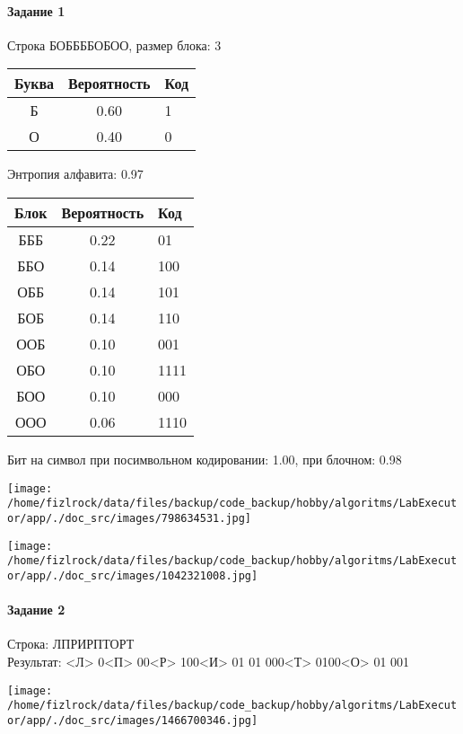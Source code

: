 \documentclass[a4paper, 12pt]{article}
\begin{document}
\paragraph{Задание 1}

Строка БОББББОБОО, размер блока: 3
\begin{center}
 \begin{tabular}{ |c|c|l| } 
  \hline
     Буква & Вероятность & Код\\ \hline
Б & 0.60 & 1\\\hline
О & 0.40 & 0
\\ \hline \end{tabular}
\end{center}
Энтропия алфавита: 0.97
\begin{center}
 \begin{tabular}{ |c|c|l| } 
  \hline
     Блок & Вероятность & Код\\ \hline
БББ & 0.22 & 01\\\hline
ББО & 0.14 & 100\\\hline
ОББ & 0.14 & 101\\\hline
БОБ & 0.14 & 110\\\hline
ООБ & 0.10 & 001\\\hline
ОБО & 0.10 & 1111\\\hline
БОО & 0.10 & 000\\\hline
ООО & 0.06 & 1110
\\ \hline \end{tabular}
\end{center}
Бит на символ при посимвольном кодировании: 1.00, при блочном: 0.98

\texttt{[image: /home/fizlrock/data/files/backup/code\_backup/hobby/algoritms/LabExecutor/app/./doc\_src/images/798634531.jpg]}

\texttt{[image: /home/fizlrock/data/files/backup/code\_backup/hobby/algoritms/LabExecutor/app/./doc\_src/images/1042321008.jpg]}
\pagebreak
\paragraph{Задание 2}

Строка: 
ЛПРИРПТОРТ\\
Результат: <Л> 0<П> 00<Р> 100<И> 01 01 000<Т> 0100<О> 01 001

\texttt{[image: /home/fizlrock/data/files/backup/code\_backup/hobby/algoritms/LabExecutor/app/./doc\_src/images/1466700346.jpg]}
\end{document}
